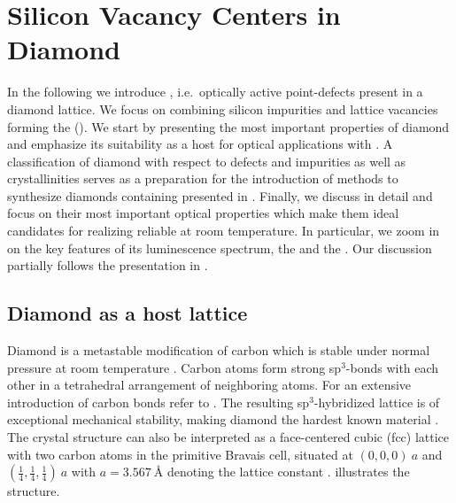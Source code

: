 
\chapter{Silicon Vacancy Centers in Diamond}	\label{ch::sivs}

  In the following we introduce \ccs, i.e.\ optically active point-defects present in a diamond lattice.
  We focus on \ccs combining silicon impurities and lattice vacancies forming the \sivc (\siv).
  We start by presenting the most important properties of diamond and emphasize its suitability as a host for optical applications with \ccs.
  A classification of diamond with respect to defects and impurities as well as crystallinities serves as a preparation for the introduction of methods to synthesize diamonds containing \sivs presented in .
  Finally, we discuss \sivs in detail and focus on their most important optical properties which make them ideal candidates for realizing reliable \spss at room temperature.
  In particular, we zoom in on the key features of its luminescence spectrum, the \zpl and the \psb.
  Our discussion partially follows the presentation in \cite{Riedrich-moller2014, Neu2012, Becker2014dissertation, Steinmetz2011,Hepp2014dissertation}.

\section{Diamond as a host lattice}

  Diamond is a metastable modification of carbon which is stable under normal pressure at room temperature \cite{Bundy1989}. Carbon atoms form strong sp$^3$-bonds with each other in a tetrahedral arrangement of neighboring atoms. For an extensive introduction of carbon bonds refer to . The resulting sp$^3$-hybridized lattice is of exceptional mechanical stability, making diamond the hardest known material \cite{telling2000theoretical}.
  The crystal structure can also be interpreted as a face-centered cubic (fcc) lattice with two carbon atoms in the primitive Bravais cell, situated at $(0,0,0) \ a$ and $ (\frac{1}{4}, \frac{1}{4}, \frac{1}{4}) \ a$ with $a = \SI{3.567}{\angstrom}$ denoting the lattice constant \cite{Saotome1998}.  illustrates the structure.

